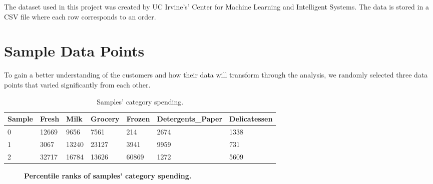 \documentclass[twoside,openright,titlepage,numbers=noenddot,headinclude,%
               footinclude=true,cleardoublepage=empty,abstractoff,BCOR=5mm,%
               paper=a4,fontsize=11pt,ngerman,american]{scrreprt}
\numberwithin{theorem}{chapter}
\numberwithin{definition}{chapter}
\numberwithin{algorithm}{chapter}
\numberwithin{figure}{chapter}
\numberwithin{table}{chapter}
\numberwithin{equation}{chapter}
\begin{document}
The dataset used in this project was created by UC Irvine's' Center for Machine Learning and Intelligent Systems. The data is stored in a CSV file where each row corresponds to an order.

\section*{Sample Data Points}
To gain a better understanding of the customers and how their data will transform through the analysis, we randomly selected three data points that varied significantly from each other. 

\begin{table}[!htbp]
  \begin{center}
  \caption{Samples' category spending.}
    \begin{tabular}{ |l|l|l|l|l|l|l| } 
    \hline
    Sample & Fresh & Milk & Grocery & Frozen & Detergents\_Paper & Delicatessen\\[1ex]

    \hline
    
      0 &12669 &9656  &7561  &214   &2674  &1338 \\
      1 &3067  &13240 &23127 &3941  &9959  &731  \\
      2 &32717 &16784 &13626 &60869 &1272  &5609 \\
    \hline
    \end{tabular}
    \label{tableSamplesCategorySpending}
  \end{center}
\end{table}

\begin{figure}[!hbtp]
\centering
    
    \caption{\textbf{Percentile ranks of samples' category spending. }}
\end{figure}
\end{document}
